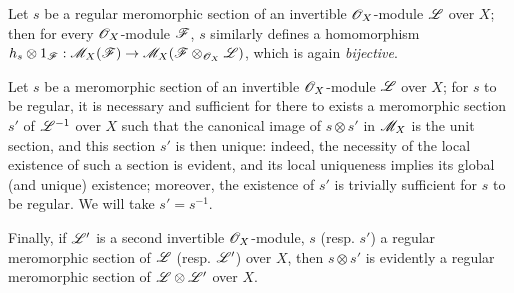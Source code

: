 \begin{env}[20.1.9]
\label{IV.20.1.9}
Let $s$ be a regular meromorphic section of an invertible $\mathscr{O}_X$-module $\mathscr{L}$ over $X$;
then for every $\mathscr{O}_X$-module $\mathscr{F}$, $s$ similarly defines a homomorphism $h_s\otimes 1_\sh{F}:\sh{M}_X(\sh{F})\to\sh{M}_X(\sh{F}\otimes_{\sh{O}_X}\sh{L})$, which is again \emph{bijective}.
\end{env}

\begin{env}[20.1.10]
\label{IV.20.1.10}
Let $s$ be a meromorphic section of an invertible $\mathscr{O}_X$-module $\mathscr{L}$ over $X$;
for $s$ to be regular, it is necessary and sufficient for there to exists a meromorphic section $s'$ of $\mathscr{L}^{-1}$ over $X$ such that the canonical image of $s\otimes s'$ in $\mathscr{M}_X$  is the unit section, and this section $s'$ is then unique:
indeed, the necessity of the local existence of such a section is evident, and its local uniqueness implies its global (and unique) existence;
moreover, the existence of $s'$ is trivially sufficient for $s$ to be regular.
We will take $s'=s^{-1}$.

Finally, if $\mathscr{L}'$ is a second invertible $\mathscr{O}_X$-module, $s$ (resp. $s'$) a regular meromorphic section of $\mathscr{L}$ (resp. $\mathscr{L}'$) over $X$, then $s\otimes s'$ is evidently a regular meromorphic section of $\mathscr{L}\otimes\mathscr{L}'$ over $X$.
\end{env}


